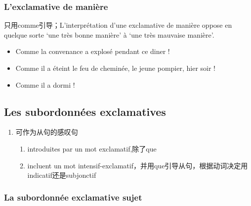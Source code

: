 \documentclass[UTF8]{report}
\begin{document}
\subsubsection{L’exclamative de manière}
只用comme引导；L’interprétation d’une exclamative de manière oppose en quelque sorte ‘une très bonne manière’ à ‘une très mauvaise manière’. 
\begin{itemize}
    \item Comme la convenance a explosé pendant ce diner !
    \item Comme il a éteint le feu de cheminée, le jeune pompier, hier soir !
    \item Comme il a dormi !
\end{itemize}


\subsection{Les subordonnées exclamatives}

\begin{enumerate}
    \item 可作为从句的感叹句
    \begin{enumerate}
        \item introduites par un mot exclamatif,除了que
        \item incluent un mot intensif-exclamatif，并用que引导从句，根据动词决定用indicatif还是subjonctif
    \end{enumerate}
\end{enumerate}


\subsubsection{La subordonnée exclamative sujet}
\end{document}
